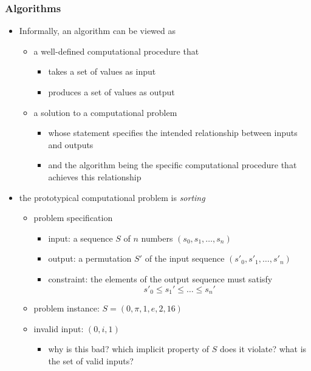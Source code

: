 %
%


\begin{frame}[fragile]
%
  \frametitle{Algorithms}
%
  \begin{itemize}
%
  \item Informally, an algorithm can be viewed as
    \begin{itemize}
    \item a well-defined computational procedure that
      \begin{itemize}
      \item takes a set of values as input
      \item produces a set of values as output
      \end{itemize}
    \item a solution to a computational problem
      \begin{itemize}
      \item whose statement specifies the intended relationship between inputs and outputs
      \item and the algorithm being the specific computational procedure that achieves this
        relationship
      \end{itemize}
    \end{itemize}
%
  \item the prototypical computational problem is {\em sorting}
    \begin{itemize}
    \item problem specification
      \begin{itemize}
      \item input: a sequence $S$ of $n$ numbers $(s_{0}, s_{1}, \ldots, s_{n})$
      \item output: a permutation $S'$ of the input sequence $(s'_{0}, s'_{1}, \ldots, s'_{n})$
      \item constraint: the elements of the output sequence must satisfy 
        \[ s'_{0} \leq s_{1}' \leq \ldots \leq s_{n}'\]
      \end{itemize}
    \item problem instance: $S = (0, \pi, 1, e, 2, 16)$
    \item invalid input: $(0, i, 1)$
      \begin{itemize}
      \item why is this bad? which implicit property of $S$ does it violate?  what is the set
        of valid inputs?
      \end{itemize}
    \end{itemize}
%
  \end{itemize}
%
\end{frame}


